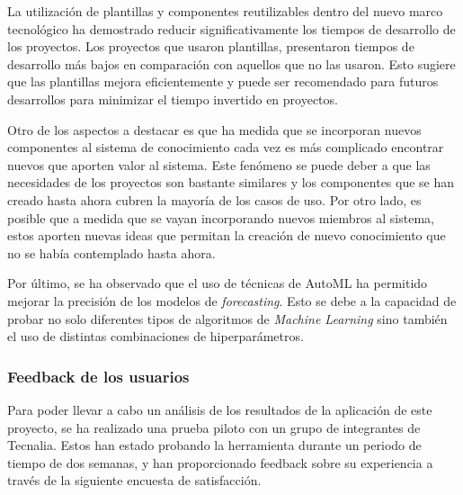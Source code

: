 La utilización de plantillas y componentes reutilizables dentro del nuevo 
marco tecnológico ha demostrado reducir significativamente los tiempos de 
desarrollo de los proyectos. Los proyectos que usaron plantillas, 
presentaron tiempos de desarrollo más bajos en comparación con aquellos que no 
las usaron. Esto sugiere que las plantillas mejora eficientemente y puede ser 
recomendado para futuros desarrollos para minimizar el tiempo invertido en proyectos.\medskip

Otro de los aspectos a destacar es que ha medida que se incorporan nuevos componentes 
al sistema de conocimiento cada vez es más complicado encontrar nuevos que aporten
valor al sistema. Este fenómeno se puede deber a que las necesidades de los proyectos
son bastante similares y los componentes que se han creado hasta ahora cubren la mayoría
de los casos de uso. Por otro lado, es posible que a medida que se vayan incorporando
nuevos miembros al sistema, estos aporten nuevas ideas que permitan la creación de nuevo
conocimiento que no se había contemplado hasta ahora.\medskip

Por último, se ha observado que el uso de técnicas de AutoML ha permitido mejorar
la precisión de los modelos de \textit{forecasting}. Esto se debe a la capacidad de
probar no solo diferentes tipos de algoritmos de \textit{Machine Learning} sino también el uso
de distintas combinaciones de hiperparámetros. 

\subsubsection{Feedback de los usuarios}
Para poder llevar a cabo un análisis de los resultados de la aplicación
de este proyecto, se ha realizado una prueba piloto con un grupo de integrantes
de Tecnalia. Estos han estado probando la herramienta durante un periodo de tiempo
de dos semanas, y han proporcionado feedback sobre su experiencia a través de
la siguiente encuesta de satisfacción.

